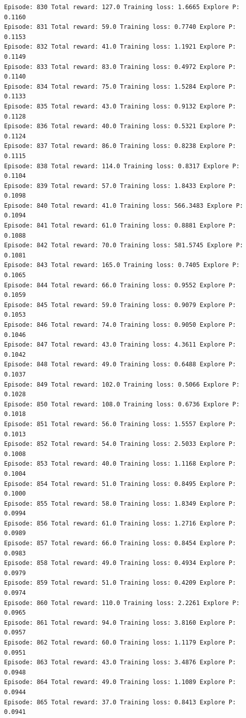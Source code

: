\documentclass[11pt]{article}
\begin{document}
\begin{Verbatim}[commandchars=\\\{\}]
Episode: 830 Total reward: 127.0 Training loss: 1.6665 Explore P: 0.1160
Episode: 831 Total reward: 59.0 Training loss: 0.7740 Explore P: 0.1153
Episode: 832 Total reward: 41.0 Training loss: 1.1921 Explore P: 0.1149
Episode: 833 Total reward: 83.0 Training loss: 0.4972 Explore P: 0.1140
Episode: 834 Total reward: 75.0 Training loss: 1.5284 Explore P: 0.1133
Episode: 835 Total reward: 43.0 Training loss: 0.9132 Explore P: 0.1128
Episode: 836 Total reward: 40.0 Training loss: 0.5321 Explore P: 0.1124
Episode: 837 Total reward: 86.0 Training loss: 0.8238 Explore P: 0.1115
Episode: 838 Total reward: 114.0 Training loss: 0.8317 Explore P: 0.1104
Episode: 839 Total reward: 57.0 Training loss: 1.8433 Explore P: 0.1098
Episode: 840 Total reward: 41.0 Training loss: 566.3483 Explore P: 0.1094
Episode: 841 Total reward: 61.0 Training loss: 0.8881 Explore P: 0.1088
Episode: 842 Total reward: 70.0 Training loss: 581.5745 Explore P: 0.1081
Episode: 843 Total reward: 165.0 Training loss: 0.7405 Explore P: 0.1065
Episode: 844 Total reward: 66.0 Training loss: 0.9552 Explore P: 0.1059
Episode: 845 Total reward: 59.0 Training loss: 0.9079 Explore P: 0.1053
Episode: 846 Total reward: 74.0 Training loss: 0.9050 Explore P: 0.1046
Episode: 847 Total reward: 43.0 Training loss: 4.3611 Explore P: 0.1042
Episode: 848 Total reward: 49.0 Training loss: 0.6488 Explore P: 0.1037
Episode: 849 Total reward: 102.0 Training loss: 0.5066 Explore P: 0.1028
Episode: 850 Total reward: 108.0 Training loss: 0.6736 Explore P: 0.1018
Episode: 851 Total reward: 56.0 Training loss: 1.5557 Explore P: 0.1013
Episode: 852 Total reward: 54.0 Training loss: 2.5033 Explore P: 0.1008
Episode: 853 Total reward: 40.0 Training loss: 1.1168 Explore P: 0.1004
Episode: 854 Total reward: 51.0 Training loss: 0.8495 Explore P: 0.1000
Episode: 855 Total reward: 58.0 Training loss: 1.8349 Explore P: 0.0994
Episode: 856 Total reward: 61.0 Training loss: 1.2716 Explore P: 0.0989
Episode: 857 Total reward: 66.0 Training loss: 0.8454 Explore P: 0.0983
Episode: 858 Total reward: 49.0 Training loss: 0.4934 Explore P: 0.0979
Episode: 859 Total reward: 51.0 Training loss: 0.4209 Explore P: 0.0974
Episode: 860 Total reward: 110.0 Training loss: 2.2261 Explore P: 0.0965
Episode: 861 Total reward: 94.0 Training loss: 3.8160 Explore P: 0.0957
Episode: 862 Total reward: 60.0 Training loss: 1.1179 Explore P: 0.0951
Episode: 863 Total reward: 43.0 Training loss: 3.4876 Explore P: 0.0948
Episode: 864 Total reward: 49.0 Training loss: 1.1089 Explore P: 0.0944
Episode: 865 Total reward: 37.0 Training loss: 0.8413 Explore P: 0.0941

\end{Verbatim}
\end{document}
